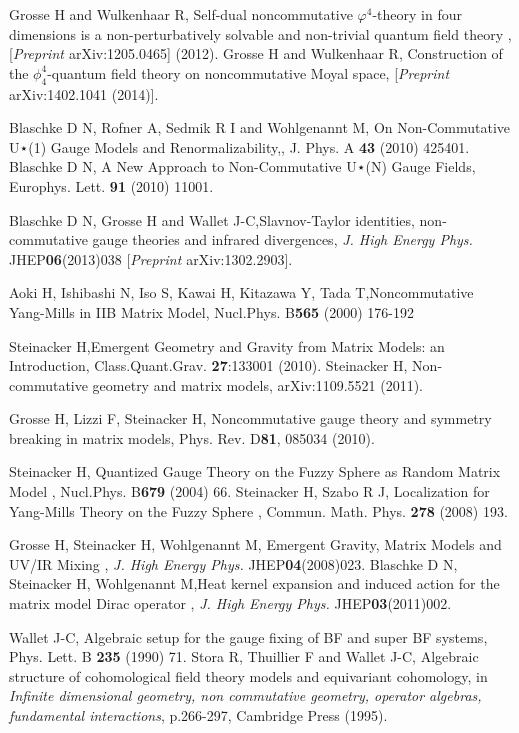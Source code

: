 \documentclass[a4paper,11pt,twoside]{article}
\numberwithin{equation}{section}
\theoremstyle{nonumberplain}
\begin{document}
\begin{thebibliography}{50}
 Grosse H and Wulkenhaar R, {{Self-dual noncommutative $\varphi^4$-theory in four dimensions is a non-perturbatively solvable and non-trivial quantum field theory}} , [{\it{Preprint }} arXiv:1205.0465] (2012). Grosse H and Wulkenhaar R, {{Construction of the $\phi^4_4$-quantum field theory on noncommutative Moyal space}}, [{\it{Preprint }} arXiv:1402.1041 (2014)].

 Blaschke D N, Rofner A, Sedmik R I and Wohlgenannt M, {{On Non-Commutative U⋆(1)
Gauge Models and Renormalizability}},, J. Phys. A {\bf{43}} (2010) 425401. Blaschke D N, {{A New Approach to Non-Commutative U⋆(N) Gauge Fields}}, Europhys. Lett. {\bf{91}} (2010) 11001.

 Blaschke D N, Grosse H and Wallet J-C,{{Slavnov-Taylor identities, non-commutative gauge theories and infrared divergences}}, {\it{J. High Energy Phys.}} JHEP{\bf{06}}(2013)038 [{\it{Preprint }} arXiv:1302.2903].

 Aoki H, Ishibashi N, Iso S, Kawai H, Kitazawa Y, Tada T,{{Noncommutative Yang-Mills in IIB Matrix Model}}, Nucl.Phys. B{\bf{565}} (2000) 176-192 

 Steinacker H,{{Emergent Geometry and Gravity from Matrix Models: an Introduction}}, Class.Quant.Grav. {\bf{27}}:133001 (2010). Steinacker H, {{Non-commutative geometry and matrix models}}, arXiv:1109.5521 (2011).

 Grosse H, Lizzi F, Steinacker H, {{Noncommutative gauge theory and symmetry breaking in matrix models}}, Phys. Rev. D{\bf{81}}, 085034 (2010).

  Steinacker H, {{Quantized Gauge Theory on the Fuzzy Sphere as Random Matrix Model }}, Nucl.Phys. B{\bf{679}} (2004) 66. Steinacker H, Szabo R J, {{Localization for Yang-Mills Theory on the Fuzzy Sphere }}, Commun. Math. Phys. {\bf{278}} (2008) 193.

 Grosse H, Steinacker H, Wohlgenannt M, {{Emergent Gravity, Matrix Models and UV/IR Mixing }}, {\it{J. High Energy Phys.}} JHEP{\bf{04}}(2008)023. Blaschke D N, Steinacker H, Wohlgenannt M,{{Heat kernel expansion and induced action for the matrix model Dirac operator }}, {\it{J. High Energy Phys.}} JHEP{\bf{03}}(2011)002.

 Wallet J-C, {Algebraic setup for the gauge fixing of {BF} and super
  {BF} systems}, Phys. Lett. B {\bf{235}} (1990) 71. 
Stora R, Thuillier F and Wallet J-C, {{Algebraic structure of
  cohomological field theory models and equivariant cohomology}}, {in
  \textit{Infinite dimensional geometry, non commutative geometry, operator
  algebras, fundamental interactions}, p.266-297, Cambridge Press (1995)}.


\end{thebibliography}
\end{document}
